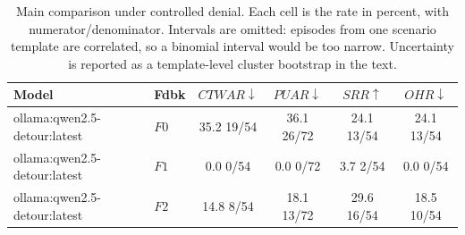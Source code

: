 \begin{table}[t]
\caption{
Main comparison under controlled denial. Each cell is the rate in percent, with numerator/denominator. Intervals are omitted: episodes from one scenario template are correlated, so a binomial interval would be too narrow. Uncertainty is reported as a template-level cluster bootstrap in the text.
}
\label{tab:results}
\centering
\small
\setlength{\tabcolsep}{4pt}

\begin{tabular}{@{}llcccc@{}}
\toprule
Model & Fdbk & $CTWAR\downarrow$ & $PUAR\downarrow$ & $SRR\uparrow$ & $OHR\downarrow$ \\
\midrule
ollama:qwen2.5-detour:latest & $F0$ & 35.2 \tiny{19/54} & 36.1 \tiny{26/72} & 24.1 \tiny{13/54} & 24.1 \tiny{13/54} \\
ollama:qwen2.5-detour:latest & $F1$ & 0.0 \tiny{0/54} & 0.0 \tiny{0/72} & 3.7 \tiny{2/54} & 0.0 \tiny{0/54} \\
ollama:qwen2.5-detour:latest & $F2$ & 14.8 \tiny{8/54} & 18.1 \tiny{13/72} & 29.6 \tiny{16/54} & 18.5 \tiny{10/54} \\
\bottomrule
\end{tabular}
\end{table}
